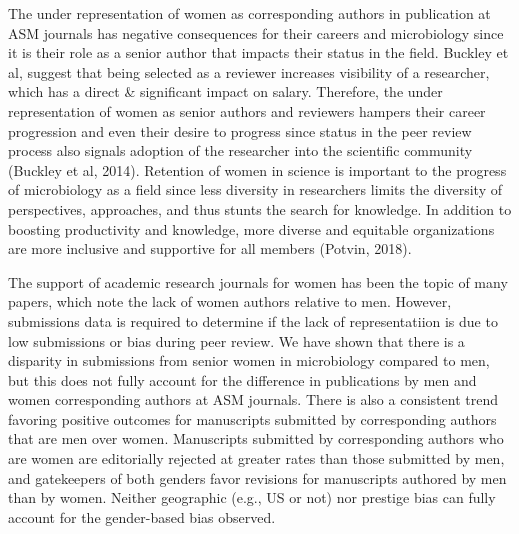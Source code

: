 \documentclass[11pt,]{article}
\begin{document}
The under representation of women as corresponding authors in
publication at ASM journals has negative consequences for their careers
and microbiology since it is their role as a senior author that impacts
their status in the field. Buckley et al, suggest that being selected as
a reviewer increases visibility of a researcher, which has a direct \&
significant impact on salary. Therefore, the under representation of
women as senior authors and reviewers hampers their career progression
and even their desire to progress since status in the peer review
process also signals adoption of the researcher into the scientific
community (Buckley et al, 2014). Retention of women in science is
important to the progress of microbiology as a field since less
diversity in researchers limits the diversity of perspectives,
approaches, and thus stunts the search for knowledge. In addition to
boosting productivity and knowledge, more diverse and equitable
organizations are more inclusive and supportive for all members (Potvin,
2018).

The support of academic research journals for women has been the topic
of many papers, which note the lack of women authors relative to men.
However, submissions data is required to determine if the lack of
representatiion is due to low submissions or bias during peer review. We
have shown that there is a disparity in submissions from senior women in
microbiology compared to men, but this does not fully account for the
difference in publications by men and women corresponding authors at ASM
journals. There is also a consistent trend favoring positive outcomes
for manuscripts submitted by corresponding authors that are men over
women. Manuscripts submitted by corresponding authors who are women are
editorially rejected at greater rates than those submitted by men, and
gatekeepers of both genders favor revisions for manuscripts authored by
men than by women. Neither geographic (e.g., US or not) nor prestige
bias can fully account for the gender-based bias observed.
\end{document}
